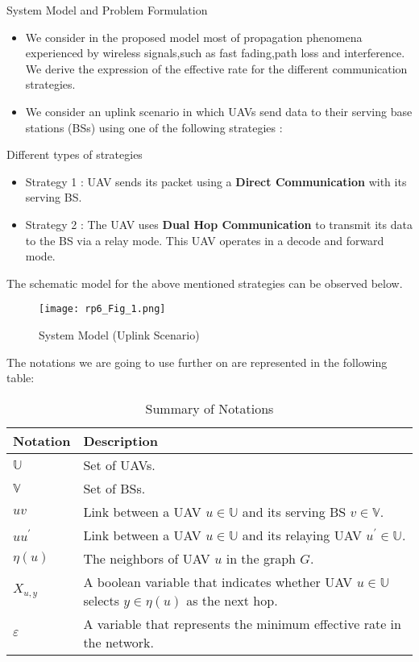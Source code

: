 \documentclass{beamer}
\begin{document}
\begin{frame}{System Model and Problem Formulation}
  \begin{itemize}
      \item We consider in the proposed model most of propagation phenomena experienced by wireless signals,such as fast fading,path loss and interference. We derive the expression of the effective rate for the different communication strategies.
      \item We consider an uplink scenario in which UAVs send data to their serving base stations (BSs) using one of the following strategies :
      \end{itemize}
      \begin{block}{Different types of strategies}
        \begin{itemize}
            \item Strategy 1 : UAV sends its packet using a \textbf{Direct Communication} with its serving BS.
            \item Strategy 2 : The UAV uses \textbf{Dual Hop Communication} to transmit its data to the BS via a relay mode. This UAV operates in a decode and forward mode.
         \end{itemize}
      \end{block}
\end{frame}

\begin{frame}{}
 The schematic model for the above mentioned strategies can be observed below.
\begin{figure}[!ht]
    \centering
    \texttt{[image: rp6\_Fig\_1.png]}
    \caption{System Model (Uplink Scenario)}
    \label{fig:System Model}
\end{figure}
\end{frame}

\begin{frame}{}
The notations we are going to use further on are represented in the following table:
\begin{table}[h]
\caption{Summary of Notations}
\centering
\begin{tabular}{|p{}|p{}|}
\hline
 \textbf{Notation} & \textbf{Description}\\
\hline
$\mathbb{U}$ & Set of UAVs.\\
\hline
$\mathbb{V}$& Set of BSs.\\
\hline
$uv$  & Link between a UAV $u \in \mathbb{U}$ and its serving BS $v \in \mathbb{V}$.\\
\hline
$uu^\prime$ & Link between a UAV $u \in \mathbb{U}$ and its relaying UAV $u^\prime \in \mathbb{U}$.\\
\hline
$\eta(u)$ & The neighbors of UAV $u$ in the graph $G$.\\
\hline
$X_{u,y}$ & A boolean variable that indicates whether UAV $u \in \mathbb{U}$ selects $y \in \eta(u)$ as the next hop.\\
\hline
$\varepsilon$ & A variable that represents the minimum effective rate in the network.\\
\hline
\end{tabular}
\label{table:1}
\end{table}
\end{frame}
\end{document}
